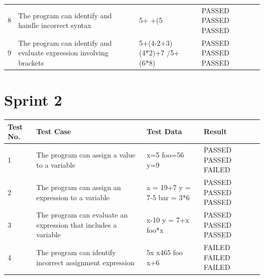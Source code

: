 \documentclass[a4paper, oneside, 11pt]{report}
\begin{document}
\begin{tabular}{|p{8mm}|p{60mm}|p{30mm}|p{15mm}|}
8 & The program can identify and handle incorrect syntax & 5+ \newline 5+(5 \newline *8  &  PASSED \newline PASSED \newline PASSED \\
9 & The program can identify and evaluate expression involving brackets & 5+(4-2+3) \newline (4*2)+7 \newline 10/5+(6*8)  &  PASSED \newline PASSED \newline PASSED \\
\end{tabular}

\section{Sprint 2}

\begin{tabular}{|p{8mm}|p{60mm}|p{30mm}|p{15mm}|}Test No. & Test Case & Test Data & Result \\ \hline
1 & The program can assign a value to a variable & x=5 \newline foo=56 \newline y=9  &  PASSED \newline PASSED \newline FAILED \\
2 & The program can assign an expression to a variable & a = 19+7 \newline y = 7-5 \newline bar = 3*6  &  PASSED \newline PASSED \newline PASSED \\
3 & The program can evaluate an expression that includes a variable & x-10 \newline y = 7+x \newline foo*x  &  PASSED \newline PASSED \newline PASSED \\
4 & The program can identify incorrect assignment expression & 5x \newline x465 \newline foo x+6  &  FAILED \newline FAILED \newline FAILED \\
\end{tabular}
\end{document}
